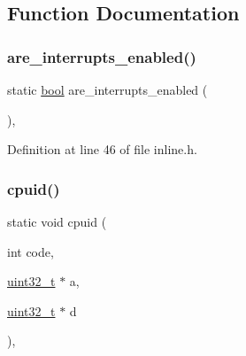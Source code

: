 \subsection{Function Documentation}
\mbox{\label{a00035_ae7df27a6150c6a020eead928af349b21_ae7df27a6150c6a020eead928af349b21}} 
\subsubsection{\texorpdfstring{are\+\_\+interrupts\+\_\+enabled()}{are\_interrupts\_enabled()}}
{\footnotesize\ttfamily static \hyperlink{a00032_af6a258d8f3ee5206d682d799316314b1_af6a258d8f3ee5206d682d799316314b1}{bool} are\+\_\+interrupts\+\_\+enabled (\begin{DoxyParamCaption}{ }\end{DoxyParamCaption})\hspace{0.3cm}{\ttfamily [inline]}, {\ttfamily [static]}}



Definition at line 46 of file inline.\+h.

\mbox{\label{a00035_adacb2a50c30267ac5314bfcb92ac1d85_adacb2a50c30267ac5314bfcb92ac1d85}} 
\subsubsection{\texorpdfstring{cpuid()}{cpuid()}}
{\footnotesize\ttfamily static void cpuid (\begin{DoxyParamCaption}\item[{int}]{code,  }\item[{\hyperlink{a00032_a435d1572bf3f880d55459d9805097f62_a435d1572bf3f880d55459d9805097f62}{uint32\+\_\+t} $\ast$}]{a,  }\item[{\hyperlink{a00032_a435d1572bf3f880d55459d9805097f62_a435d1572bf3f880d55459d9805097f62}{uint32\+\_\+t} $\ast$}]{d }\end{DoxyParamCaption})\hspace{0.3cm}{\ttfamily [inline]}, {\ttfamily [static]}}



